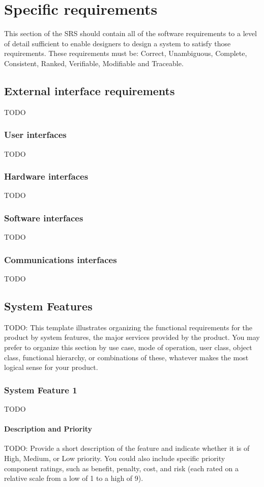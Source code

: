 \section{Specific requirements}
This section of the SRS should contain all of the software requirements to a level of detail sufficient to
enable designers to design a system to satisfy those requirements. These requirements must be: Correct, Unambiguous, Complete, Consistent, Ranked, Verifiable, Modifiable and Traceable.
\subsection{External interface requirements}
TODO
\subsubsection{User interfaces}
TODO
\subsubsection{Hardware interfaces}
TODO
\subsubsection{Software interfaces}
TODO
\subsubsection{Communications interfaces}
TODO
\subsection{System Features}
TODO: This template illustrates organizing the functional requirements for the product by system features, the major services provided by the product. You may prefer to organize this section by use case, mode of operation, user class, object class, functional hierarchy, or combinations of these, whatever makes the most logical sense for your product.
\subsubsection{System Feature 1}
TODO
\paragraph{Description and Priority}
TODO: Provide a short description of the feature and indicate whether it is of High, Medium, or Low priority. You could also include specific priority component ratings, such as benefit, penalty, cost, and risk (each rated on a relative scale from a low of 1 to a high of 9).

